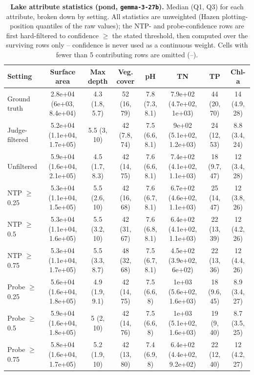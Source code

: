 \begin{table}[ht]
\centering
\begin{tabular}{lccccccc}
\toprule
Setting & Surface area & Max depth & Veg. cover & pH & TN & TP & Chl-a \\
\midrule
Ground truth & 2.8e+04 (6e+03, 8.4e+04) & 4.3 (1.8, 5.7) & 52 (16, 79) & 7.8 (7.3, 8.1) & 7.9e+02 (4.7e+02, 1e+03) & 44 (20, 70) & 14 (4.9, 28) \\
Judge-filtered & 5.2e+04 (1.1e+04, 1.7e+05) & 5.5 (3, 10) & 42 (7.8, 74) & 7.5 (6.6, 8.1) & 9e+02 (5.1e+02, 1.2e+03) & 24 (12, 53) & 8.8 (3.4, 24) \\
Unfiltered & 5.9e+04 (1.6e+04, 2.1e+05) & 4.5 (1.7, 8.3) & 42 (14, 75) & 7.6 (6.6, 8.1) & 7.4e+02 (4.1e+02, 1.1e+03) & 18 (9.7, 47) & 12 (3.4, 28) \\
NTP $\geq$0.25 & 5.3e+04 (1.1e+04, 1.5e+05) & 5.5 (2.6, 10) & 42 (16, 68) & 7.6 (6.7, 8.1) & 6.7e+02 (4.6e+02, 1.1e+03) & 25 (14, 47) & 12 (3.8, 26) \\
NTP $\geq$0.5 & 5.3e+04 (1.1e+04, 1.6e+05) & 5.5 (3.2, 10) & 42 (31, 67) & 7.6 (6.8, 8.1) & 6.4e+02 (4.1e+02, 1.1e+03) & 22 (13, 39) & 12 (4.2, 26) \\
NTP $\geq$0.75 & 5.3e+04 (1.1e+04, 1.7e+05) & 5.5 (3.3, 8.7) & 48 (32, 68) & 7.5 (6.7, 8.1) & 4.5e+02 (3.9e+02, 6e+02) & 22 (13, 36) & 12 (4.4, 26) \\
Probe $\geq$0.25 & 5.6e+04 (1.6e+04, 1.8e+05) & 4.9 (1.9, 9.1) & 42 (14, 75) & 7.5 (6.6, 8) & 1e+03 (5.6e+02, 1.6e+03) & 18 (9.6, 45) & 8.9 (3.4, 27) \\
Probe $\geq$0.5 & 5.9e+04 (1.6e+04, 1.8e+05) & 5 (2, 10) & 42 (14, 76) & 7.5 (6.6, 8) & 1e+03 (5.1e+02, 1.6e+03) & 19 (9, 40) & 8.7 (3.5, 25) \\
Probe $\geq$0.75 & 5.8e+04 (1.6e+04, 1.7e+05) & 5.2 (1.9, 10) & 42 (13, 80) & 7.4 (6.9, 8) & 6.4e+02 (4.4e+02, 9.2e+02) & 22 (12, 40) & 12 (4.2, 27) \\
\bottomrule
\end{tabular}
\caption{\textbf{Lake attribute statistics (pond, \texttt{gemma-3-27b}).} Median (Q1, Q3) for each attribute, broken down by setting. All statistics are unweighted (Hazen plotting-position quantiles of the raw values); the NTP- and probe-confidence rows are first hard-filtered to confidence $\geq$ the stated threshold, then computed over the surviving rows only -- confidence is never used as a continuous weight. Cells with fewer than 5 contributing rows are omitted (--).}
\label{tab:meta-pond-gemma-3-27b-lake}
\end{table}


